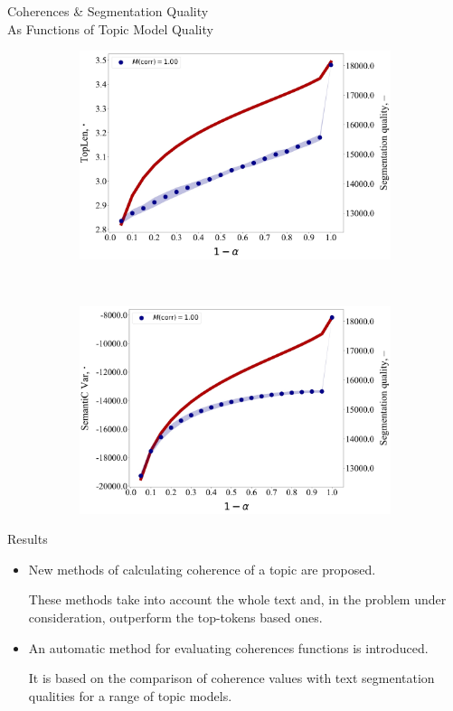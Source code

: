 \documentclass[russian]{beamer}
\begin{document}
\begin{frame}{Coherences \& Segmentation Quality\\ As Functions of Topic Model Quality}
\begin{figure}[h]
\begin{subfigure}[t]{0.48\textwidth}
      \includegraphics[width=\linewidth]{toplen-iteration.jpg}
    \end{subfigure}
    ~
    \begin{subfigure}[t]{0.48\textwidth}
      \includegraphics[width=\linewidth]{semantic_var-iteration.jpg}
    \end{subfigure}
  \end{figure}
\end{frame}


\begin{frame}{Results}
  \begin{itemize}
  \setlength\itemsep{0.5cm}
  \item
    New methods of calculating coherence of a topic are proposed.
    
    \smallskip
    
    These methods take into account the whole text and, in the problem under consideration, outperform the top-tokens based ones.
  \item
    An automatic method for evaluating coherences functions is introduced.
    
    \smallskip
    
    It is based on the comparison of coherence values with text segmentation qualities for a range of topic models.
  \end{itemize}
\end{frame}
\end{document}
